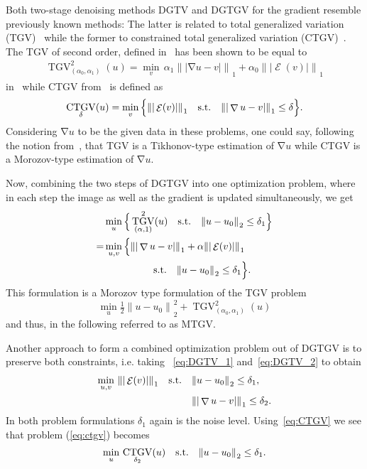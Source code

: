 \documentclass[twocolumn,envcountsame]{svjour3}
\newcommand{\norm}[2][]{{\|{#2}\|_{}}_{#1}}
\newcommand{\abs}[1]{|#1|}
\newcommand{\subjectto}{\text{\quad s.t.\quad }}
\DeclareMathOperator{\grad}{\nabla}
\DeclareMathOperator{\symgrad}{\mathcal{E}}
\DeclareMathOperator{\TGV}{TGV}
\DeclareMathOperator{\CTGV}{CTGV}
\begin{document}
Both two-stage denoising methods DGTV and DGTGV for the gradient resemble previously known methods: The latter is related to total generalized variation (TGV)~\cite{bredies2010total} while the former to constrained total generalized variation (CTGV)~\cite{komander2017denoising}.
The TGV of second order, defined in~\cite{bredies2010total} has been shown to be equal to
\begin{align}\label{eq:TGV}
	\TGV^2_{(\alpha_0,\alpha_1)} (u) 
	= \min_v\, \alpha_1\norm[1]{\abs{\grad u - v}} + 
		\alpha_0\norm[1]{\abs{\symgrad(v)}}
\end{align}
in~\cite{bredies2013properties,bredies2010total} while  CTGV from~\cite{komander2017denoising} is defined as 
\begin{align}\label{eq:CTGV}
	\CTGV_{\delta} (u) 
	= \min_v\Big\{ \norm[1]{\abs{\symgrad(v)}}\subjectto \norm[1]{\abs{\grad u - v}}\leq\delta\Big\}.
\end{align}
Considering $\grad u$ to be the given data in these problems, one could say, following the notion from~\cite{lorenz2013neccond}, that TGV is a Tikhonov-type estimation of $\grad u$ while CTGV is a Morozov-type estimation of $\grad u$.

Now, combining the two steps of DGTGV into one optimization 
problem, where in each step the image as well as the gradient is 
updated simultaneously, we get 
\begin{align}\label{eq:mtgv}
\begin{split}
	&\min_{u} \Big\{\TGV^2_{(\alpha,1)} (u) 
		\subjectto \norm[2]{u-u_0}\leq \delta_1\Big\}\\
	=&\min_{u,v} \Big\{\norm[1]{\abs{\grad u - v}} 
		+ \alpha\norm[1]{\abs{\symgrad(v)}}\\
		&\qquad\qquad\subjectto \norm[2]{u-u_0}\leq \delta_1\Big\}.
\end{split}
\end{align}
This formulation is a Morozov type formulation of the TGV problem
\begin{equation}\label{eq:minTGV}
  \min_{u} \tfrac12\norm[2]{u-u_{0}}^{2} + \TGV^2_{(\alpha_{0},\alpha_{1})} (u) 
\end{equation}
and thus, in the following referred to as MTGV.

Another approach to form a combined optimization problem out of 
DGTGV is to preserve both constraints, i.e. taking~
\eqref{eq:DGTV_1} and~\eqref{eq:DGTV_2} to obtain
\begin{align}\label{eq:ctgv}
\begin{split}
	\min_{u,v}\, \norm[1]{\abs{\symgrad(v)}}
	\subjectto
		&\norm[2]{u-u_0}\leq \delta_1,\\
		&\norm[1]{\abs{\grad u - v}}\leq \delta_2.
\end{split}
\end{align}
In both problem formulations $\delta_1$ again is the 
noise level.
Using~\eqref{eq:CTGV} we see that
problem (\ref{eq:ctgv}) becomes
\begin{align}\label{eq:minCTGV}
	\min_u \, \CTGV_{\delta_2}(u) \subjectto 
	 \norm[2]{u-u_0}\leq\delta_1.
\end{align}
\end{document}
